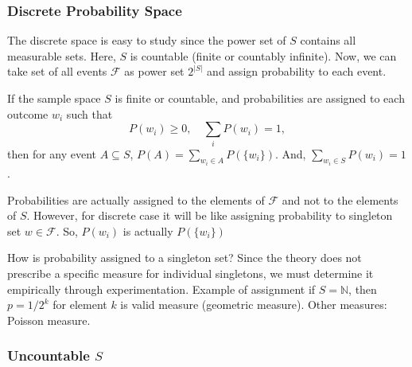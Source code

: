 \begin{center}
\end{center}







\subsubsection{Discrete Probability Space}

The discrete space is easy to study since the power set of $S$ contains all measurable sets.
Here, $S$ is countable (finite or countably infinite). Now, we can take set of all events $\mathcal{F}$ as power set $2^{|S|}$ and assign probability to each event. 

If the sample space $S$ is finite or countable, and probabilities are assigned to each outcome $w_i$ such that
\[
P(w_i) \geq 0, \quad \sum_i P(w_i) = 1,
\]
then for any event $A \subseteq S$,
$P(A) = \sum_{w_i \in A} P(\{w_i\})$.
And, $\sum_{w_i \in S} P(w_i) = 1$.

Probabilities are actually assigned to the elements of $\mathcal{F}$ and not to the elements of $S$. However, for discrete case it will be like assigning probability to singleton set ${w} \in \mathcal{F}$. So, $P(w_i)$ is actually $P(\{w_i\})$

How is probability assigned to a singleton set? Since the theory does not prescribe a specific measure for individual singletons, we must determine it empirically through experimentation. Example of assignment if $S=\mathbb{N}$, then $p=1/2^k$ for element $k$ is valid measure (geometric measure). Other measures: Poisson measure.

\subsubsection{Uncountable $S$}

